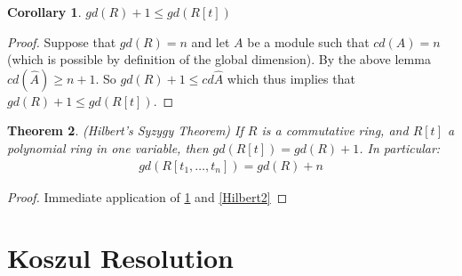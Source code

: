 \documentclass[12pt]{book}
\newtheorem{theorem}{Theorem}[chapter]
\newtheorem{corollary}[theorem]{Corollary}
\theoremstyle{definition}
\begin{document}
\begin{corollary}\label{Hilbert1}
    $gd(R) + 1 \leq gd(R[t])$
\end{corollary}
\begin{proof}
    Suppose that $gd(R) = n$ and let $A$ be a module such that $cd(A) = n$ (which is possible by definition of the global dimension). By the above lemma $cd(\hat{A}) \geq n + 1$. So $gd(R) + 1 \leq cd{\hat{A}}$ which thus implies that $gd(R) + 1 \leq gd(R[t])$.  
\end{proof}
\begin{theorem}
    (Hilbert's Syzygy Theorem) If $R$ is a commutative ring, and $R[t]$ a polynomial ring in one variable, then $gd(R[t]) = gd(R) + 1$. In particular:
    \begin{align*}
        gd(R[t_1, \dots, t_n]) = gd(R) + n
    \end{align*}
\end{theorem}
\begin{proof}
    Immediate application of \ref{Hilbert1} and \ref{Hilbert2}
\end{proof}
\chapter{Koszul Resolution}
\end{document}
